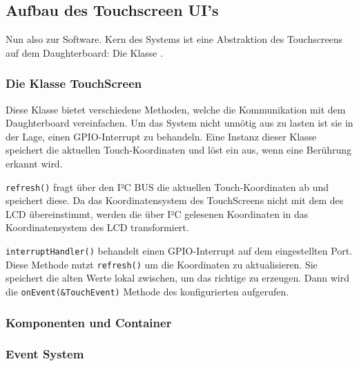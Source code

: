 \subsection{Aufbau des Touchscreen UI's}
	Nun also zur Software. Kern des Systems ist eine Abstraktion des Touchscreens auf dem Daughterboard:
	Die Klasse .
	
	
	\subsubsection{Die Klasse TouchScreen}\label{sec:touchscreen_class}
		Diese Klasse bietet verschiedene Methoden, welche die Kommunikation mit dem Daughterboard vereinfachen.
		Um das System nicht unnötig aus zu lasten ist sie in der Lage, einen GPIO-Interrupt zu behandeln.
		Eine Instanz dieser Klasse speichert die aktuellen Touch-Koordinaten und löst ein  aus, wenn eine Berührung erkannt wird.

		\medskip
		\texttt{refresh()} fragt über den I²C BUS die aktuellen Touch-Koordinaten ab und speichert diese.
		Da das Koordinatensystem des TouchScreens nicht mit dem des LCD übereinstimmt, werden die über I²C gelesenen Koordinaten
		in das Koordinatensystem des LCD transformiert.

		\medskip
		\texttt{interruptHandler()} behandelt einen GPIO-Interrupt auf dem eingestellten Port.
		Diese Methode nutzt \texttt{refresh()} um die Koordinaten zu aktualisieren. Sie speichert die alten Werte lokal zwischen,
		um das richtige  zu erzeugen. Dann wird die \texttt{onEvent(\&TouchEvent)} Methode
		des konfigurierten  aufgerufen.
		
	
	\subsubsection{Komponenten und Container}\label{sec:components}
	
	\subsubsection{Event System}\label{sec:EventSystem}